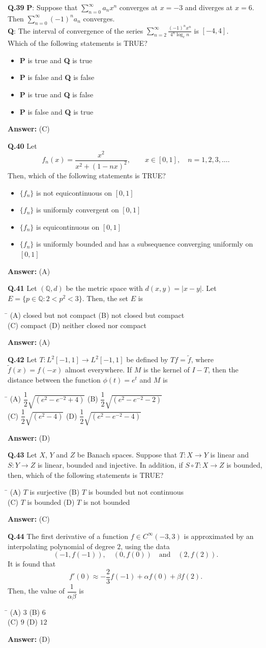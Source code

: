\documentclass[11pt,a4paper]{article}
\newcommand{\optsfourA}[4]{%
  \begin{tabbing}
    \hspace{0.48\linewidth}\=\kill
    (A) #1 \> (B) #2 \\[2pt]
    (C) #3 \> (D) #4
  \end{tabbing}%
}
\newcommand{\optslistA}[4]{%
  \begin{itemize}
    \setlength{\itemsep}{2pt}\setlength{\parskip}{0pt}
    \item[(A)] #1
    \item[(B)] #2
    \item[(C)] #3
    \item[(D)] #4
  \end{itemize}%
}
\newcommand{\ans}[1]{\textbf{Answer:} #1\par\medskip}
\begin{document}
\textbf{Q.39} \textbf{P}: Suppose that $\displaystyle\sum_{n=0}^{\infty} a_n x^n$ converges at $x = -3$ and diverges at $x = 6$. Then $\displaystyle\sum_{n=0}^{\infty} (-1)^n a_n$ converges.\\
\textbf{Q}: The interval of convergence of the series $\displaystyle\sum_{n=2}^{\infty} \frac{(-1)^n x^n}{4^n \log_e n}$ is $[-4, 4]$.\\
Which of the following statements is TRUE?
\optslistA{\textbf{P} is true and \textbf{Q} is true}{\textbf{P} is false and \textbf{Q} is false}{\textbf{P} is true and \textbf{Q} is false}{\textbf{P} is false and \textbf{Q} is true}
\ans{(C)}

\textbf{Q.40} Let
\[
  f_n(x) = \frac{x^2}{x^2 + (1 - nx)^2}, \qquad x \in [0, 1],\quad n = 1, 2, 3, \dots.
\]
Then, which of the following statements is TRUE?
\optslistA{$\{f_n\}$ is not equicontinuous on $[0, 1]$}{$\{f_n\}$ is uniformly convergent on $[0, 1]$}{$\{f_n\}$ is equicontinuous on $[0, 1]$}{$\{f_n\}$ is uniformly bounded and has a subsequence converging uniformly on $[0, 1]$}
\ans{(A)}

\textbf{Q.41} Let $(\mathbb{Q}, d)$ be the metric space with $d(x, y) = |x - y|$. Let $E = \{p \in \mathbb{Q} : 2 < p^2 < 3\}$. Then, the set $E$ is
\optsfourA{closed but not compact}{not closed but compact}{compact}{neither closed nor compact}
\ans{(A)}

\textbf{Q.42} Let $T : L^2[-1, 1] \to L^2[-1, 1]$ be defined by $Tf = \tilde{f}$, where $\tilde{f}(x) = f(-x)$ almost everywhere. If $M$ is the kernel of $I - T$, then the distance between the function $\phi(t) = e^t$ and $M$ is
\optsfourA{$\dfrac{1}{2}\sqrt{(e^2 - e^{-2} + 4)}$}{$\dfrac{1}{2}\sqrt{(e^2 - e^{-2} - 2)}$}{$\dfrac{1}{2}\sqrt{(e^2 - 4)}$}{$\dfrac{1}{2}\sqrt{(e^2 - e^{-2} - 4)}$}
\ans{(D)}

\textbf{Q.43} Let $X$, $Y$ and $Z$ be Banach spaces. Suppose that $T : X \to Y$ is linear and $S : Y \to Z$ is linear, bounded and injective. In addition, if $S \circ T : X \to Z$ is bounded, then, which of the following statements is TRUE?
\optsfourA{$T$ is surjective}{$T$ is bounded but not continuous}{$T$ is bounded}{$T$ is not bounded}
\ans{(C)}

\textbf{Q.44} The first derivative of a function $f \in C^\infty(-3, 3)$ is approximated by an interpolating polynomial of degree $2$, using the data
\[
  (-1, f(-1)), \quad (0, f(0)) \quad \text{and} \quad (2, f(2)).
\]
It is found that
\[
  f'(0) \approx -\frac{2}{3} f(-1) + \alpha f(0) + \beta f(2).
\]
Then, the value of $\dfrac{1}{\alpha\beta}$ is
\optsfourA{$3$}{$6$}{$9$}{$12$}
\ans{(D)}
\end{document}
